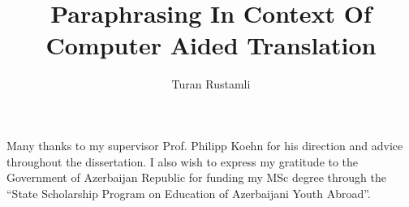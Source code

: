 \documentclass[msc,ai,logo,sansheadings]{infthesis}
\title{\bigskip \bigskip \bigskip \bigskip \bigskip \bigskip \bigskip Paraphrasing In Context Of \\ Computer Aided Translation}
\author{Turan Rustamli}
\begin{document}
\begin{preliminary}

\maketitle

\begin{acknowledgements}
\begin{large}
Many thanks to my supervisor Prof. Philipp Koehn for his direction and advice throughout the dissertation. I also wish to express my gratitude to the Government of Azerbaijan Republic for funding my MSc degree through the ``State Scholarship Program on Education of Azerbaijani Youth Abroad''.
\end{large}
\end{acknowledgements}

\standarddeclaration


\tableofcontents


\end{preliminary}









\appendix






\end{document}

